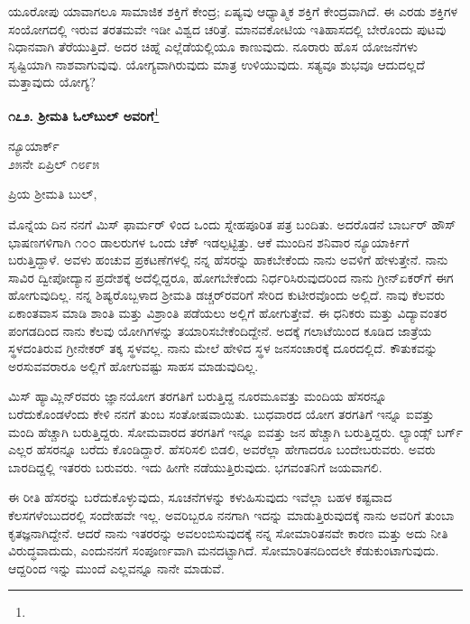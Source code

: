 ಯೂರೋಪು ಯಾವಾಗಲೂ ಸಾಮಾಜಿಕ ಶಕ್ತಿಗೆ ಕೇಂದ್ರ; ಏಷ್ಯವು ಆಧ್ಯಾತ್ಮಿಕ ಶಕ್ತಿಗೆ ಕೇಂದ್ರವಾಗಿದೆ. ಈ ಎರಡು ಶಕ್ತಿಗಳ ಸಂಯೋಗದಲ್ಲಿ ಇರುವ ತರತಮವೇ ಇಡೀ ವಿಶ್ವದ ಚರಿತ್ರೆ. ಮಾನವಕೋಟಿಯ ಇತಿಹಾಸದಲ್ಲಿ ಬೇರೊಂದು ಪುಟವು ನಿಧಾನವಾಗಿ ತೆರೆಯುತ್ತಿದೆ. ಅದರ ಚಿಹ್ನೆ ಎಲ್ಲೆಡೆಯಲ್ಲಿಯೂ ಕಾಣುವುದು. ನೂರಾರು ಹೊಸ ಯೋಜನೆಗಳು ಸೃಷ್ಟಿಯಾಗಿ ನಾಶವಾಗುವುವು. ಯೋಗ್ಯವಾಗಿರುವುದು ಮಾತ್ರ ಉಳಿಯುವುದು. ಸತ್ಯವೂ ಶುಭವೂ ಆದುದಲ್ಲದೆ ಮತ್ತಾವುದು ಯೋಗ್ಯ?

\begin{center}
\textbf{೧೭೨. ಶ‍್ರೀಮತಿ ಓಲ್‌ಬುಲ್‌ ಅವರಿಗೆ}\footnote{}
\end{center}

\begin{flushright}
ನ್ಯೂಯಾರ್ಕ್\\೨೫ನೇ ಏಪ್ರಿಲ್ ೧೮೯೫
\end{flushright}

\noindent
ಪ್ರಿಯ ಶ‍್ರೀಮತಿ ಬುಲ್,

ಮೊನ್ನೆಯ ದಿನ ನನಗೆ ಮಿಸ್ ಫಾರ್ಮ‌ರ್ ಳಿಂದ ಒಂದು ಸ್ನೇಹಪೂರಿತ ಪತ್ರ ಬಂದಿತು. ಅದರೊಡನೆ ಬಾರ್ಬರ್ ಹೌಸ್ ಭಾಷಣಗಳಿಗಾಗಿ ೧೦೦ ಡಾಲರುಗಳ ಒಂದು ಚೆಕ್ ಇಡಲ್ಪಟ್ಟಿತ್ತು. ಆಕೆ ಮುಂದಿನ ಶನಿವಾರ ನ್ಯೂಯಾರ್ಕಿಗೆ ಬರುತ್ತಿದ್ದಾಳೆ. ಅವಳು ಹಂಚುವ ಪ್ರಕಟಣೆಗಳಲ್ಲಿ ನನ್ನ ಹೆಸರನ್ನು ಹಾಕಬೇಕೆಂದು ನಾನು ಅವಳಿಗೆ ಹೇಳುತ್ತೇನೆ. ನಾನು ಸಾವಿರ ದ್ವೀಪೋದ್ಯಾನ ಪ್ರದೇಶಕ್ಕೆ  ಅದೆಲ್ಲಿದ್ದರೂ, ಹೋಗಬೇಕೆಂದು ನಿರ್ಧರಿಸಿರುವುದರಿಂದ ನಾನು ಗ್ರೀನ್‌ಏಕರ್‌ಗೆ ಈಗ ಹೋಗುವುದಿಲ್ಲ. ನನ್ನ ಶಿಷ್ಯರೊಬ್ಬಳಾದ ಶ‍್ರೀಮತಿ ಡಚ್ಚರ್‌ರವರಿಗೆ ಸೇರಿದ ಕುಟೀರವೊಂದು ಅಲ್ಲಿದೆ. ನಾವು ಕೆಲವರು ಏಕಾಂತವಾಸ ಮಾಡಿ ಶಾಂತಿ ಮತ್ತು ವಿಶ್ರಾಂತಿ ಪಡೆಯಲು ಅಲ್ಲಿಗೆ ಹೋಗುತ್ತೇವೆ. ಈ ಧನಿಕರು ಮತ್ತು ವಿದ್ಯಾವಂತರ ಪಂಗಡದಿಂದ ನಾನು ಕೆಲವು ಯೋಗಿಗಳನ್ನು ತಯಾರಿಸಬೇಕೆಂದಿದ್ದೇನೆ. ಅದಕ್ಕೆ ಗಲಾಟೆಯಿಂದ ಕೂಡಿದ ಜಾತ್ರೆಯ ಸ್ಥಳದಂತಿರುವ ಗ್ರೀನೇಕರ್ ತಕ್ಕ ಸ್ಥಳವಲ್ಲ. ನಾನು ಮೇಲೆ ಹೇಳಿದ ಸ್ಥಳ ಜನಸಂಚಾರಕ್ಕೆ ದೂರದಲ್ಲಿದೆ. ಕೌತುಕವನ್ನು ಅರಸುವವರಾರೂ ಅಲ್ಲಿಗೆ ಹೋಗುವಷ್ಟು ಸಾಹಸ ಮಾಡುವುದಿಲ್ಲ.

ಮಿಸ್ ಹ್ಯಾಮ್ಲಿನ್‌ರವರು ಜ್ಞಾನಯೋಗ ತರಗತಿಗೆ ಬರುತ್ತಿದ್ದ ನೂರಮೂವತ್ತು ಮಂದಿಯ ಹೆಸರನ್ನೂ ಬರೆದುಕೊಂಡಳೆಂದು ಕೇಳಿ ನನಗೆ ತುಂಬ ಸಂತೋಷವಾಯಿತು. ಬುಧವಾರದ ಯೋಗ ತರಗತಿಗೆ ಇನ್ನೂ ಐವತ್ತು ಮಂದಿ ಹೆಚ್ಚಾಗಿ ಬರುತ್ತಿದ್ದರು. ಸೋಮವಾರದ ತರಗತಿಗೆ ಇನ್ನೂ ಐವತ್ತು ಜನ ಹೆಚ್ಚಾಗಿ ಬರುತ್ತಿದ್ದರು. ಲ್ಯಾಂಡ್ಸ್ ಬರ್ಗ್ ಎಲ್ಲರ ಹೆಸರನ್ನೂ ಬರೆದು ಕೊಂಡಿದ್ದಾರೆ. ಹೆಸರಿಸಲಿ ಬಿಡಲಿ, ಅವರೆಲ್ಲಾ ಹೇಗಾದರೂ ಬಂದೇಬರುವರು. ಅವರು ಬಾರದಿದ್ದಲ್ಲಿ ಇತರರು ಬರುವರು. ಇದು ಹೀಗೇ ನಡೆಯುತ್ತಿರುವುದು. ಭಗವಂತನಿಗೆ ಜಯವಾಗಲಿ.

ಈ ರೀತಿ ಹೆಸರನ್ನು ಬರೆದುಕೊಳ್ಳುವುದು, ಸೂಚನೆಗಳನ್ನು ಕಳುಹಿಸುವುದು ಇವೆಲ್ಲಾ ಬಹಳ ಕಷ್ಟವಾದ ಕೆಲಸಗಳೆಂಬುದರಲ್ಲಿ ಸಂದೇಹವೇ ಇಲ್ಲ. ಅವರಿಬ್ಬರೂ ನನಗಾಗಿ ಇದನ್ನು ಮಾಡುತ್ತಿರುವುದಕ್ಕೆ ನಾನು ಅವರಿಗೆ ತುಂಬಾ ಕೃತಜ್ಞನಾಗಿದ್ದೇನೆ. ಆದರೆ ನಾನು ಇತರರನ್ನು ಅವಲಂಬಿಸುವುದಕ್ಕೆ ನನ್ನ ಸೋಮಾರಿತನವೇ ಕಾರಣ ಮತ್ತು ಅದು ನೀತಿ ವಿರುದ್ಧವಾದುದು, ಎಂದುನನಗೆ ಸಂಪೂರ್ಣವಾಗಿ ಮನದಟ್ಟಾಗಿದೆ. ಸೋಮಾರಿತನದಿಂದಲೇ ಕೆಡುಕುಂಟಾಗುವುದು. ಆದ್ದರಿಂದ ಇನ್ನು ಮುಂದೆ ಎಲ್ಲವನ್ನೂ ನಾನೇ ಮಾಡುವೆ.

